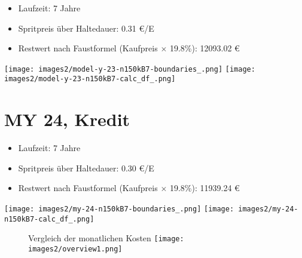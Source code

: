 \documentclass[landscape, DIV=99, 14pt]{scrartcl}
\begin{document}
\begin{itemize}
    \item Laufzeit: 7 Jahre
    \item Spritpreis \"uber Haltedauer: 0.31 \euro{}/E
    \item Restwert nach Faustformel (Kaufpreis $\times$ 19.8\%): 12093.02 \euro{}
\end{itemize}

\pagebreak

\begin{center}
\texttt{[image: images2/model-y-23-n150kB7-boundaries\_.png]}
\null
\vspace{0.5cm}
\texttt{[image: images2/model-y-23-n150kB7-calc\_df\_.png]}
\end{center}

\pagebreak


\twocolumn

\section*{MY 24, Kredit}

\begin{itemize}
    \item Laufzeit: 7 Jahre
    \item Spritpreis \"uber Haltedauer: 0.30 \euro{}/E
    \item Restwert nach Faustformel (Kaufpreis $\times$ 19.8\%): 11939.24 \euro{}
\end{itemize}

\pagebreak

\begin{center}
\texttt{[image: images2/my-24-n150kB7-boundaries\_.png]}
\null
\vspace{0.5cm}
\texttt{[image: images2/my-24-n150kB7-calc\_df\_.png]}
\end{center}

\pagebreak



\pagebreak

\onecolumn
\begin{figure}
\centering
Vergleich der monatlichen Kosten
\vspace{1em}
\texttt{[image: images2/overview1.png]}
\end{figure}
\vfill 
\end{document}
